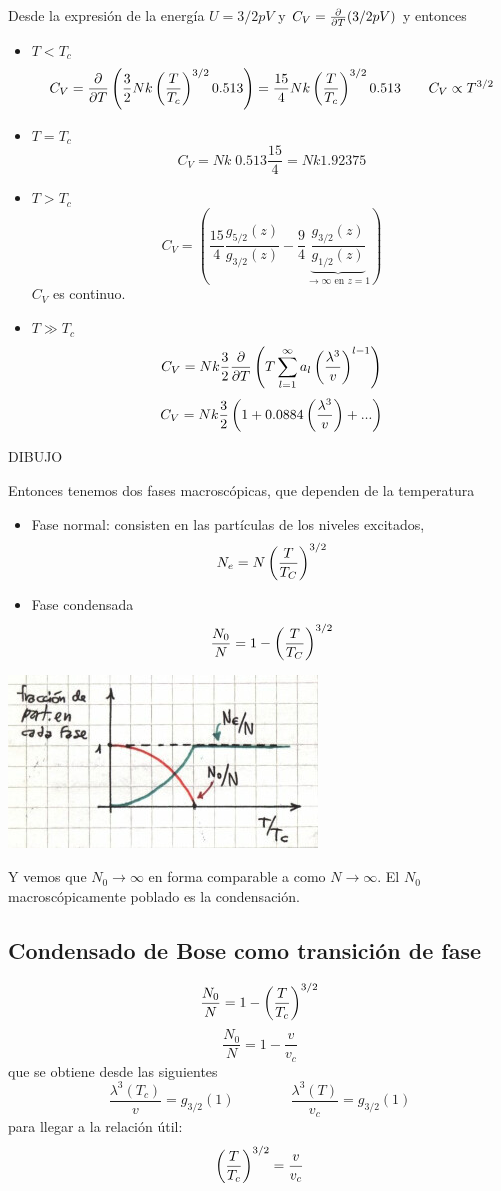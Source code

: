 \documentclass[10pt,oneside]{CBFT_book}
\begin{document}
Desde la expresión de la energía $ U = 3/2 p V $ y $C_V = \frac{\partial^{\hspace{-0.05em}} {}}{\partial {T}^{\hspace{-0.05em}}}(3/2 p V)$
y entonces
\begin{itemize}
 \item $ T < T_c $ 
 \[
	C_V = \frac{\partial^{\hspace{-0.05em}} {}}{\partial {T}^{\hspace{-0.05em}}}\left( \frac{3}{2} N k \left( \frac{ T }{ T_c } \right)^{3/2} 0.513  \right) = 
	\frac{15}{4} N k \left( \frac{ T }{ T_c } \right)^{3/2} 0.513 \qquad C_V \propto T^{3/2}
 \]
 \item $ T = T_c $ 
 \[
	C_V = N k \; 0.513 \frac{15}{4} = N k 1.92375
 \]
 \item $ T > T_c $ 
 \[
	C_V = \left( \frac{15}{4}\frac{ g_{5/2}(z) }{ g_{3/2}(z) } - 
	\frac{9}{4} \underbrace{\frac{ g_{3/2}(z) }{ g_{1/2}(z) }}_{\to \infty \text{ en } z=1} \right)
 \]
 $C_V$ es continuo.
 \item $ T \gg T_c $ 
 \[
	C_V = N k \frac{3}{2} \frac{\partial^{\hspace{-0.05em}} {}}{\partial {T}^{\hspace{-0.05em}}} \left( T \sum_{l=1}^\infty a_l \left( \frac{ \lambda^3 }{ v } \right)^{l-1} \right)
 \]
 \[
	C_V = N k \frac{3}{2} \left( 1 + 0.0884 \left( \frac{ \lambda^3 }{ v } \right) + ... \right)
 \]
\end{itemize}

DIBUJO

Entonces tenemos dos fases macroscópicas, que dependen de la temperatura
\begin{itemize}
 \item Fase normal: consisten en las partículas de los niveles excitados,
 \[
	N_e = N \left( \frac{ T }{ T_C } \right)^{3/2}
 \]
 \item Fase condensada
 \[
	\frac{N_0}{N} = 1 - \left( \frac{ T }{ T_C } \right)^{3/2}
 \]
\end{itemize}

\includegraphics[scale=0.5]{images/1606329628.jpg}

Y vemos que $N_0 \to \infty$ en forma comparable a como $N \to \infty$. El $N_0$ macroscópicamente poblado
es la condensación.

\subsection{Condensado de Bose como transición de fase}

\[
	\frac{N_0}{N} = 1 - \left( \frac{ T }{ T_c } \right)^{3/2}
\]
\[
	\frac{N_0}{N} = 1 - \frac{v}{v_c}
\]
que se obtiene desde las siguientes
\[
	\frac{\lambda^3(T_c)}{v} = g_{3/2}(1) \qquad \qquad  \frac{\lambda^3(T)}{v_c} = g_{3/2}(1)
\]
para llegar a la relación útil:
\[
	\left( \frac{ T }{ T_c } \right)^{3/2} = \frac{v}{v_c}
\]
\end{document}
